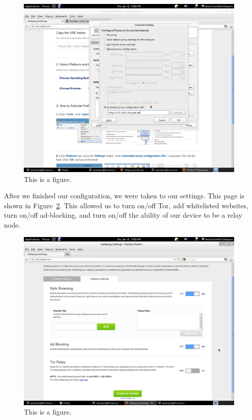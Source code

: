 \begin{figure}[htb]
\begin{center}
\includegraphics[width=\textwidth]{proxyconfig}
\caption{This is a figure.}
\label{fig:proxyconfig}
\end{center}
\end{figure}

After we finished our configuration, we were taken to our settings.  This page is shown in Figure~\ref{fig:settings}.  This allowed us to turn on/off Tor, add whitelisted websites, turn on/off ad-blocking, and turn on/off the ability of our device to be a relay node.  

\begin{figure}[htb]
\begin{center}
\includegraphics[width=\textwidth]{settings}
\caption{This is a figure.}
\label{fig:settings}
\end{center}
\end{figure}


